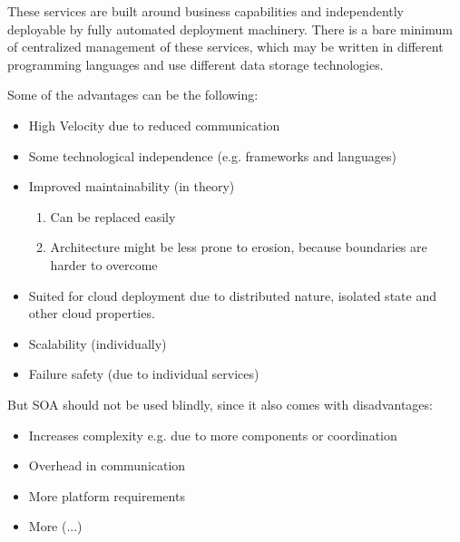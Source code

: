 \documentclass[../Main.tex]{subfiles}
\begin{document}
These services are built around business 
capabilities and independently deployable by fully automated deployment machinery.
There is a bare minimum of centralized management of these services, which may be written in
different programming languages and use different data storage technologies.


Some of the advantages can be the following:
\begin{itemize}
    \item High Velocity due to reduced communication
    \item Some technological independence (e.g. frameworks and languages)
    \item Improved maintainability (in theory)
    \begin{enumerate}
        \item Can be replaced easily
        \item Architecture might be less prone to erosion, because boundaries are harder to overcome
    \end{enumerate}
    \item Suited for cloud deployment due to distributed nature, isolated state and other cloud properties.
    \item Scalability (individually)
    \item Failure safety (due to individual services)
\end{itemize}
But SOA should not be used blindly, since it also comes with disadvantages:
\begin{itemize}
    \item Increases complexity e.g. due to more components or coordination
    \item Overhead in communication
    \item More platform requirements
    \item More (...)
\end{itemize}
\end{document}
